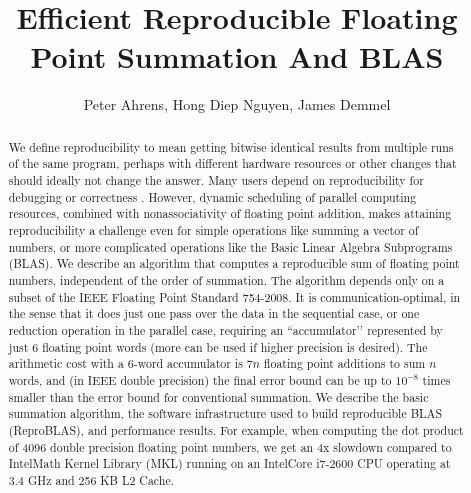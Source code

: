 \documentclass[12pt]{article}
\author{Peter Ahrens, Hong Diep Nguyen, James Demmel}
\title{Efficient Reproducible Floating Point Summation And BLAS}
\theoremstyle{definition}
\numberwithin{equation}{section}
\numberwithin{figure}{section}
\begin{document}
\noindent
\maketitle
\begin{abstract}
We define reproducibility to mean getting bitwise identical results from
multiple runs of the same program, perhaps with different hardware resources or other
changes that should ideally not change the answer. Many users depend on reproducibility
for debugging or correctness \cite{reproducibilityBOF}. However, dynamic scheduling of parallel computing
resources, combined with nonassociativity of floating point addition, makes attaining
reproducibility a challenge even for simple operations like summing a vector of numbers,
or more complicated operations like the Basic Linear Algebra Subprograms (BLAS).
We describe an algorithm that computes a reproducible sum of floating point numbers,
independent of the order of summation. The algorithm depends only on a subset of
the IEEE Floating Point Standard 754-2008. It is communication-optimal, in the sense that
it does just one pass over the data in the sequential case, or one reduction operation in
the parallel case, requiring an ``accumulator’’ represented by just 6 floating point words
(more can be used if higher precision is desired). The arithmetic cost with a 6-word
accumulator is $7n$ floating point additions to sum $n$ words, and (in IEEE double precision) the
final error bound can be up to $10^{-8}$ times smaller than the error bound for conventional
summation. We describe the basic summation algorithm, the software infrastructure used to
build reproducible BLAS (ReproBLAS), and performance results. For example, when computing the dot product of 4096 double precision floating point numbers, we get an
4x slowdown compared to Intel\textregistered Math Kernel Library (MKL) running on an Intel\textregistered Core i7-2600 CPU operating at 3.4 GHz and 256 KB L2 Cache.
\end{abstract}
\newpage
\tableofcontents
\newpage












\end{document}
